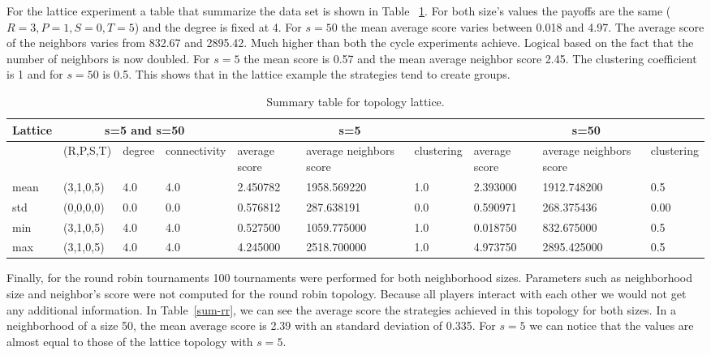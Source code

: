 For the lattice experiment a table that summarize the data set is shown in Table
~\ref{sum-lattice}. For both size's values the payoffs are the same (\(R=3, P=1, S=0, T=5\))
and the degree is fixed at 4. For \(s=50\) the mean average score
varies between 0.018 and 4.97. The average score of the neighbors varies from
832.67 and 2895.42. Much higher than both the cycle experiments achieve. Logical
based on the fact that the number of neighbors is now doubled. For \(s=5\)
the mean score is 0.57 and the mean average neighbor score 2.45.
The clustering coefficient is 1 and for \(s=50\) is 0.5.
This shows that in the lattice example the strategies tend to create groups.

\begin{table}[!hbtp]
\centering
\begin{adjustbox}{width=1\textwidth}
\small
\begin{tabular}{@{}|l|l|l|l|l|l|l|l|l|l|@{}}
\toprule
Lattice & \multicolumn{3}{c|}{s=5 and s=50} & \multicolumn{3}{c|}{s=5}                             & \multicolumn{3}{c|}{s=50}                            \\ \midrule
       & (R,P,S,T) & degree & connectivity & average score & average neighbors score & clustering & average score & average neighbors score & clustering \\ \midrule
mean   & (3,1,0,5) & 4.0    & 4.0          & 2.450782      & 1958.569220             & 1.0        & 2.393000      & 1912.748200             & 0.5        \\ \midrule
std    & (0,0,0,0) & 0.0    & 0.0          & 0.576812      & 287.638191              & 0.0        & 0.590971      & 268.375436              & 0.00       \\ \midrule
min    & (3,1,0,5) & 4.0    & 4.0          & 0.527500      & 1059.775000             & 1.0        & 0.018750      & 832.675000              & 0.5        \\ \midrule
max    & (3,1,0,5) & 4.0    & 4.0          & 4.245000      & 2518.700000             & 1.0        & 4.973750      & 2895.425000             & 0.5        \\ \bottomrule
\end{tabular}
\end{adjustbox}
\caption{Summary table for topology lattice.}
\label{sum-lattice}
\end{table}

\newpage

Finally, for the round robin tournaments 100 tournaments were performed for both
neighborhood sizes. Parameters such as neighborhood size and neighbor's score
were not computed for the round robin topology. Because all players
interact with each other we would not get any additional information. In
Table~\ref{sum-rr}, we can see the average score the strategies achieved
in this topology for both sizes. In a neighborhood of a size 50, the mean average
score is 2.39 with an standard deviation of 0.335. For \(s=5\) we can notice that the values
are almost equal to those of the lattice topology with \(s=5\).

